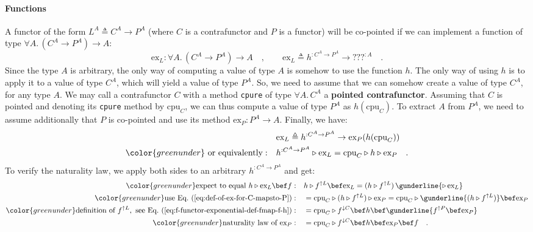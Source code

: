 \paragraph{Functions}

A functor of the form $L^{A}\triangleq C^{A}\rightarrow P^{A}$ (where
$C$ is a contrafunctor and $P$ is a functor) will be co-pointed
if we can implement a function of type $\forall A.\,(C^{A}\rightarrow P^{A})\rightarrow A$:
\[
\text{ex}_{L}:\forall A.\,(C^{A}\rightarrow P^{A})\rightarrow A\quad,\quad\quad\text{ex}_{L}\triangleq h^{:C^{A}\rightarrow P^{A}}\rightarrow\text{???}^{:A}\quad.
\]
Since the type $A$ is arbitrary, the only way of computing a value
of type $A$ is somehow to use the function $h$. The only way of
using $h$ is to apply it to a value of type $C^{A}$, which will
yield a value of type $P^{A}$. So, we need to assume that we can
somehow create a value of type $C^{A}$, for any type $A$. We may
call a contrafunctor $C$ with a method \lstinline!cpure! of type
$\forall A.\,C^{A}$ a \textbf{pointed contrafunctor}.
Assuming that $C$ is pointed and denoting its \lstinline!cpure!
method by $\text{cpu}_{C}$, we can thus compute a value of type $P^{A}$
as $h(\text{cpu}_{C})$. To extract $A$ from $P^{A}$, we need to
assume additionally that $P$ is co-pointed and use its method $\text{ex}_{P}:P^{A}\rightarrow A$.
Finally, we have:
\begin{align}
 & \text{ex}_{L}\triangleq h^{:C^{A}\rightarrow P^{A}}\rightarrow\text{ex}_{P}(h(\text{cpu}_{C}))\label{eq:def-of-ex-for-C-mapsto-P}\\
{\color{greenunder}\text{ or equivalently}:}\quad & h^{:C^{A}\rightarrow P^{A}}\triangleright\text{ex}_{L}=\text{cpu}_{C}\triangleright h\triangleright\text{ex}_{P}\quad.\nonumber 
\end{align}
To verify the naturality law, we apply both sides to an arbitrary
$h^{:C^{A}\rightarrow P^{A}}$ and get:
\begin{align*}
{\color{greenunder}\text{expect to equal }h\triangleright\text{ex}_{L}\bef f:}\quad & h\triangleright f^{\uparrow L}\bef\text{ex}_{L}=(h\triangleright f^{\uparrow L})\,\gunderline{\triangleright\,\text{ex}_{L}}\\
{\color{greenunder}\text{use Eq.~(\ref{eq:def-of-ex-for-C-mapsto-P})}:}\quad & =\text{cpu}_{C}\triangleright(h\triangleright f^{\uparrow L})\triangleright\text{ex}_{P}=\text{cpu}_{C}\triangleright\gunderline{(h\triangleright f^{\uparrow L})}\bef\text{ex}_{P}\\
{\color{greenunder}\text{definition of }f^{\uparrow L},\text{ see Eq.~(\ref{eq:f-functor-exponential-def-fmap-f-h})}:}\quad & =\text{cpu}_{C}\triangleright f^{\downarrow C}\bef h\bef\gunderline{f^{\uparrow P}\bef\text{ex}_{P}}\\
{\color{greenunder}\text{naturality law of }\text{ex}_{P}:}\quad & =\text{cpu}_{C}\triangleright f^{\downarrow C}\bef h\bef\text{ex}_{P}\bef f\quad.
\end{align*}
